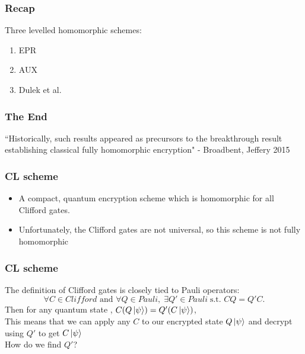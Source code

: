 \begin{frame}
\frametitle{Recap}
Three levelled homomorphic schemes: 
\begin{enumerate}
  \item EPR
  \item AUX
  \item Dulek et al. 
\end{enumerate}

\end{frame}
 
\begin{frame}
\frametitle{The End}
``Historically, such results appeared as precursors to the breakthrough result establishing classical fully homomorphic encryption" - Broadbent, Jeffery 2015
 \end{frame}
 
 
 
\begin{frame}
\frametitle{CL scheme}
\begin{itemize} 
  \item A compact, quantum encryption scheme which is homomorphic for all Clifford gates. \pause
  \item Unfortunately, the Clifford gates are not universal, so this scheme is not fully homomorphic
\end{itemize}
\end{frame}
 
\begin{frame}
\frametitle{CL scheme}
The definition of Clifford gates is closely tied to Pauli operators: 
\[ \forall C \in Clifford \text{ and } \forall Q \in Pauli, \; \exists Q' \in Pauli \; \text{s.t.  } CQ = Q'C. 
\]
\pause
Then for any quantum state \ket{\psi},  $C(Q\left\vert{\psi}\right\rangle) = Q'(C\left\vert{\psi}\right\rangle)$, \\ \pause
\vspace*{5mm}
This means that we can apply any $C$ to our encrypted state $Q\left\vert{\psi}\right\rangle$ and decrypt using $Q'$ to get $C\left\vert{\psi}\right\rangle$\\ \pause
\vspace*{5mm}
How do we find $Q'$?
\end{frame}

